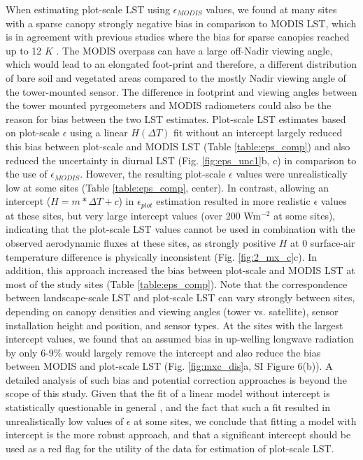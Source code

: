 \documentclass[fleqn,10pt]{wlscirep}
\begin{document}
When estimating plot-scale LST using $\epsilon_{MODIS}$ values, we found at many sites with a sparse canopy strongly negative bias in comparison to MODIS LST, which is in agreement with previous studies where the bias for sparse canopies reached up to 12 $K$ \cite{guillevic2018land}. The MODIS overpass can have a large off-Nadir viewing angle, which would lead to an elongated foot-print\cite{margulis2019joint} and therefore, a different distribution of bare soil and vegetated areas compared to the mostly Nadir viewing angle of the tower-mounted sensor. The difference in footprint and viewing angles between the tower mounted pyrgeometers and MODIS radiometers could also be the reason for bias between the two LST estimates. Plot-scale LST estimates based on plot-scale $\epsilon$ using a linear $H(\Delta T)$ fit without an intercept largely reduced this bias between plot-scale and MODIS LST (Table \ref{table:eps_comp}) and also reduced the uncertainty in diurnal LST (Fig. \ref{fig:eps_unc1}b, c) in comparison to the use of $\epsilon_{MODIS}$. However, the resulting plot-scale $\epsilon$ values were unrealistically low at some sites (Table \ref{table:eps_comp}, center). In contrast, allowing an intercept ($H=m*\Delta T + c$) in $\epsilon_{plot}$ estimation resulted in more realistic $\epsilon$ values at these sites, but very large intercept values (over 200 Wm$^{-2}$ at some sites), indicating that the plot-scale LST values cannot be used in combination with the observed aerodynamic fluxes at these sites, as strongly positive $H$ at 0 surface-air temperature difference is physically inconsistent (Fig. \ref{fig:2_mx_c}c). In addition, this approach increased the bias between plot-scale and MODIS LST at most of the study sites (Table \ref{table:eps_comp}). Note that the correspondence between landscape-scale LST and plot-scale LST can vary strongly between sites,  depending on canopy densities and viewing angles (tower vs. satellite)\cite{margulis2019joint}, sensor installation height and position, and sensor types\cite{marcolla2018geometry}. At the sites with the largest intercept values, we found that an assumed bias in up-welling longwave radiation by only 6-9\% would largely remove the intercept and also reduce the bias between MODIS and plot-scale LST (Fig. \ref{fig:mxc_dis}a, SI Figure 6(b)). A detailed analysis of such bias and potential correction approaches is beyond the scope of this study. Given that the fit of a linear model without intercept is statistically questionable in general \cite{eisenhauer2003regression}, and the fact that such a fit resulted in unrealistically low values of $\epsilon$ at some sites, we conclude that fitting a model with intercept is the more robust approach, and that a significant intercept should be used as a red flag for the utility of the data for estimation of plot-scale LST. 
\end{document}
